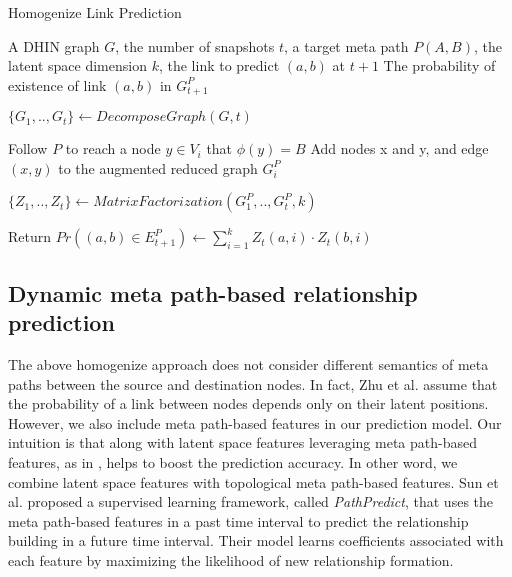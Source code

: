 \begin{algorithm}[t]
\caption{Homogenize Link Prediction}\label{alg1}
\begin{algorithmic}[1]\scriptsize
\REQUIRE A DHIN graph $G$, the number of snapshots $t$, a target meta path $P(A,B)$, the latent space dimension $k$, the link to predict $(a,b)$ at $t+1$
\ENSURE The probability of existence of link $(a,b)$ in $G^P_{t+1}$

\STATE $\{G_1, .., G_t\} \leftarrow DecomposeGraph(G, t)$

    
        \STATE Follow $P$ to reach a node $y\in V_i$ that $\phi(y)=B$%
        \STATE Add nodes x and y, and edge $(x,y)$ to the augmented reduced graph $G_i^P$ 
\ENDFOR

\ENDFOR
\STATE $\{Z_1, .., Z_t\} \leftarrow MatrixFactorization(G^P_1, .., G^P_t, k)$

\STATE Return $Pr((a,b)\in E^P_{t+1}) \leftarrow \sum_{i=1}^{k} Z_t(a,i)\cdot Z_t(b,i)$


\end{algorithmic}
\end{algorithm}



\subsection{Dynamic meta path-based relationship prediction}

The above homogenize approach does not consider different semantics of meta paths between the source and destination nodes. In fact, Zhu et al. \cite{Zhu2016} assume that the probability of a link between nodes depends only on their latent positions. However, we also include meta path-based features in our prediction model. Our intuition is that along with latent space features leveraging meta path-based features, as in \cite{sun2011ASONAM}, helps to boost the prediction accuracy. In other word, we combine latent space features with topological meta path-based features. Sun et al. \cite{sun2011ASONAM} proposed a supervised learning framework, called \textit{PathPredict}, that uses the meta path-based features in a past time interval to predict the relationship building in a future time interval. Their model learns coefficients associated with each feature by maximizing the likelihood of new relationship formation.


